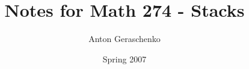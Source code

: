  \title{\vspace*{-2cm} Notes for Math 274 - Stacks\vspace*{-12mm}}
 \author{Anton Geraschenko}
 \date{Spring 2007}
 \maketitle

 {\thispagestyle{empty}
  \vspace*{-2em}
  \tableofcontents
 }
